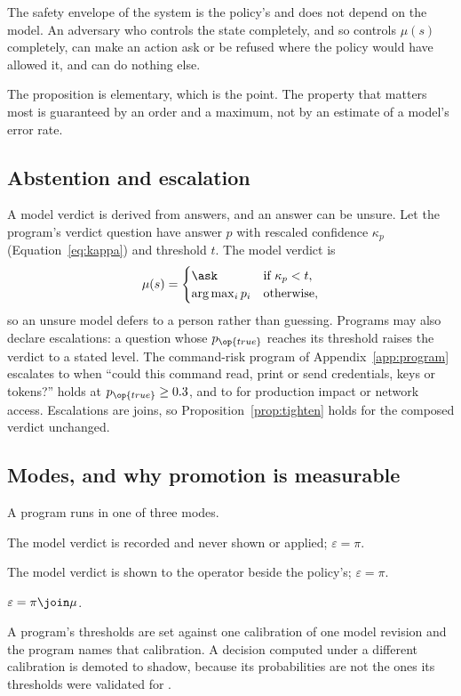 \begin{corollary}
\label{cor:envelope}
The safety envelope of the system is the policy's and does not depend on the
model. An adversary who controls the state completely, and so controls
$\mu(s)$ completely, can make an action ask or be refused where the policy
would have allowed it, and can do nothing else.
\end{corollary}

The proposition is elementary, which is the point. The property that matters
most is guaranteed by an order and a maximum, not by an estimate of a model's
error rate.

\subsection{Abstention and escalation}

A model verdict is derived from answers, and an answer can be unsure. Let the
program's verdict question have answer $p$ with rescaled confidence
$\kappa_p$ (Equation~\eqref{eq:kappa}) and threshold $t$. The model verdict is
\begin{equation}
  \mu(s) =
  \begin{cases}
    \ask & \text{if } \kappa_p < t,\\
    \arg\max_i p_i & \text{otherwise,}
  \end{cases}
\end{equation}
so an unsure model defers to a person rather than guessing. Programs may also
declare escalations: a  question whose $p_{\op{true}}$ reaches its
threshold raises the verdict to a stated level. The command-risk program of
Appendix~\ref{app:program} escalates to \deny{} when
``could this command read, print or send credentials, keys or tokens?'' holds
at $p_{\op{true}} \ge 0.3$, and to \ask{} for production impact or network
access. Escalations are joins, so Proposition~\ref{prop:tighten} holds for
the composed verdict unchanged.

\subsection{Modes, and why promotion is measurable}

A program runs in one of three modes.
\begin{description}[leftmargin=1.5em,style=nextline]
  \item[shadow] The model verdict is recorded and never shown or applied;
    $\varepsilon = \pi$.
  \item[advisory] The model verdict is shown to the operator beside the
    policy's; $\varepsilon = \pi$.
  \item[enforced] $\varepsilon = \pi \join \mu$.
\end{description}
A program's thresholds are set against one calibration of one model revision
and the program names that calibration. A decision computed under a different
calibration is demoted to shadow, because its probabilities are not the ones
its thresholds were validated for \proposed.

